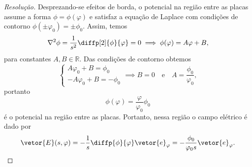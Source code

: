 \begin{proof}[Resolução]
    Desprezando-se efeitos de borda, o potencial na região entre as placas assume a forma \(\phi = \phi(\varphi)\) e satisfaz a equação de Laplace com condições de contorno \(\phi(\pm\varphi_0) = \pm \phi_0\). Assim, temos
    \begin{equation*}
        \nabla^2\phi = \frac{1}{s^2}\diffp[2]{\phi}{\varphi} = 0 \implies \phi(\varphi) = A\varphi + B,
    \end{equation*}
    para constantes \(A, B \in \mathbb{R}\). Das condições de contorno obtemos
    \begin{equation*}
        \begin{cases}
            A \varphi_0 + B = \phi_0\\
            -A \varphi_0 + B = -\phi_0
        \end{cases} \implies B = 0\quad\text{e}\quad A = \frac{\phi_0}{\varphi_0},
    \end{equation*}
    portanto
    \begin{equation*}
        \phi(\varphi) = \frac{\varphi}{\varphi_0}\phi_0
    \end{equation*}
    é o potencial na região entre as placas. Portanto, nessa região o campo elétrico é dado por
    \begin{equation*}
        \vetor{E}(s, \varphi) = -\frac{1}{s}\diffp{\phi}{\varphi}\vetor{e}_\varphi = -\frac{\phi_0}{\varphi_0 s} \vetor{e}_\varphi.
    \end{equation*}


\end{proof}
